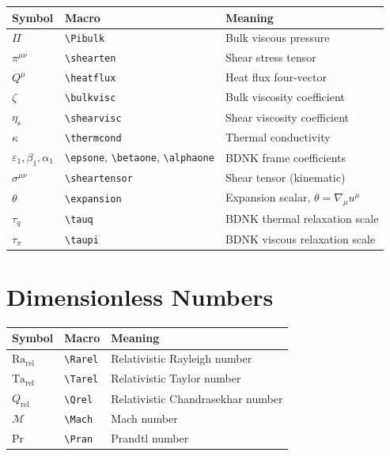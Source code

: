 \documentclass[12pt]{book}
\def\textbf#1{#1}%
\newcommand{\Pibulk}{\Pi}            %
\newcommand{\shearten}{\pi^{\mu\nu}} %
\newcommand{\heatflux}{Q^{\mu}}      %
\newcommand{\bulkvisc}{\zeta}        %
\newcommand{\shearvisc}{\eta_{\mathrm{s}}} %
\newcommand{\thermcond}{\kappa}      %
\newcommand{\epsone}{\varepsilon_1}
\newcommand{\betaone}{\beta_1}
\newcommand{\alphaone}{\alpha_1}
\newcommand{\sheartensor}{\sigma^{\mu\nu}}
\newcommand{\expansion}{\theta}
\newcommand{\Rarel}{\mathrm{Ra}_{\mathrm{rel}}}
\newcommand{\Tarel}{\mathrm{Ta}_{\mathrm{rel}}}
\newcommand{\Qrel}{Q_{\mathrm{rel}}}
\newcommand{\Mach}{\mathcal{M}}
\newcommand{\Pran}{\mathrm{Pr}}
\newcommand{\tauq}{\tau_{q}}
\newcommand{\taupi}{\tau_{\pi}}
\begin{document}
\begin{center}
\renewcommand{\arraystretch}{1.25}
\begin{tabular}{@{}lll@{}}
\toprule
\textbf{Symbol} & \textbf{Macro} & \textbf{Meaning} \\
\midrule
$\Pi$           & \verb|\Pibulk|     & Bulk viscous pressure \\
$\pi^{\mu\nu}$  & \verb|\shearten|   & Shear stress tensor \\
$Q^\mu$         & \verb|\heatflux|   & Heat flux four-vector \\
$\zeta$         & \verb|\bulkvisc|   & Bulk viscosity coefficient \\
$\eta_{\mathrm{s}}$ & \verb|\shearvisc| & Shear viscosity coefficient \\
$\kappa$        & \verb|\thermcond|  & Thermal conductivity \\
$\varepsilon_1, \beta_1, \alpha_1$ & \verb|\epsone|, \verb|\betaone|, \verb|\alphaone| & BDNK frame coefficients \\
$\sigma^{\mu\nu}$ & \verb|\sheartensor| & Shear tensor (kinematic) \\
$\theta$        & \verb|\expansion|  & Expansion scalar, $\theta = \nabla_\mu u^\mu$ \\
$\tau_q$        & \verb|\tauq|       & BDNK thermal relaxation scale \\
$\tau_\pi$      & \verb|\taupi|      & BDNK viscous relaxation scale \\
\bottomrule
\end{tabular}
\end{center}

\section*{Dimensionless Numbers}

\begin{center}
\renewcommand{\arraystretch}{1.25}
\begin{tabular}{@{}lll@{}}
\toprule
\textbf{Symbol} & \textbf{Macro} & \textbf{Meaning} \\
\midrule
$\mathrm{Ra}_{\mathrm{rel}}$ & \verb|\Rarel| & Relativistic Rayleigh number \\
$\mathrm{Ta}_{\mathrm{rel}}$ & \verb|\Tarel| & Relativistic Taylor number \\
$Q_{\mathrm{rel}}$           & \verb|\Qrel|  & Relativistic Chandrasekhar number \\
$\mathcal{M}$                & \verb|\Mach|  & Mach number \\
$\mathrm{Pr}$                & \verb|\Pran|  & Prandtl number \\
\bottomrule
\end{tabular}
\end{center}
\end{document}
